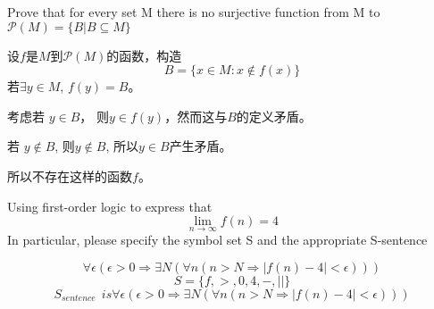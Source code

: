 \documentclass{ximera}
\begin{document}
\begin{problem}
    Prove that for every set M there is no surjective function from M to  
    $\mathcal{P}(M)=\{B | B \subseteq M \}$
    \begin{solution}
        设$f$是$M$到$\mathcal{P}(M)$的函数，构造
        $$B = \{ x \in M : x \not\in f(x)\}$$
        若$\exists y \in M$, $f(y) = B$。
        
        考虑若 $y \in B$， 则$y \in f(y)$，然而这与$B$的定义矛盾。
        
        若 $y \not\in B$, 则$y \not\in B$, 所以$y \in B$产生矛盾。

        所以不存在这样的函数$f$。
    \end{solution}
\end{problem}

\begin{problem}  Using first-order logic to express that
    $$\lim_{n \rightarrow \infty} f(n) = 4$$
    In particular, please specify the symbol set S and the appropriate S-sentence
    \begin{solution}
        $$\forall \epsilon (\epsilon > 0 \Rightarrow \exists N (\forall n(n > N \Rightarrow |f(n) - 4| < \epsilon)))$$
        $$S = \{f, >, 0, 4, -, || \}$$
        $$S_{sentence}~~is \forall \epsilon (\epsilon > 0 \Rightarrow \exists N (\forall n(n > N \Rightarrow |f(n) - 4| < \epsilon)))$$

    \end{solution}
\end{problem}
\end{document}
